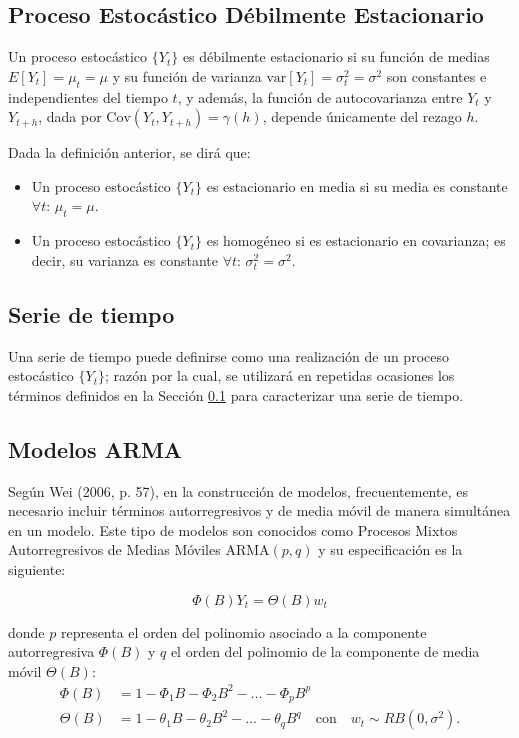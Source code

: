 \documentclass[11pt,letterpaper]{article}
\begin{document}
\subsection{Proceso Estocástico Débilmente Estacionario}
\label{sec:proceso_estocastico}
Un proceso estocástico $\{Y_t\}$ es débilmente estacionario si su función de medias $E[Y_t] = \mu_t = \mu$ y su función de varianza $\text{var}[Y_t] = \sigma_t^2 = \sigma^2$ son constantes e independientes del tiempo $t$, y además, la función de autocovarianza entre $Y_t$ y $Y_{t+h}$, dada por $\text{Cov}(Y_t, Y_{t+h}) = \gamma(h)$, depende únicamente del rezago $h$.

Dada la definición anterior, se dirá que:
\begin{itemize}
    \item Un proceso estocástico $\{Y_t\}$ es estacionario en media si su media es constante $\forall t$: $\mu_t = \mu$.
    \item Un proceso estocástico $\{Y_t\}$ es homogéneo si es estacionario en covarianza; es decir, su varianza es constante $\forall t$: $\sigma_t^2 = \sigma^2$.
\end{itemize}

\subsection{Serie de tiempo}
Una serie de tiempo puede definirse como una realización de un proceso estocástico $\{Y_t\}$; razón por la cual, se utilizará en repetidas ocasiones los términos definidos en la Sección \ref{sec:proceso_estocastico} para caracterizar una serie de tiempo.

\subsection{Modelos ARMA} 
Según Wei (2006, p. 57), en la construcción de modelos, frecuentemente, es necesario incluir términos autorregresivos y de media móvil de manera simultánea en un modelo. Este tipo de modelos son conocidos como Procesos Mixtos Autorregresivos de Medias Móviles $\text{ARMA}(p,q)$ y su especificación es la siguiente:

\begin{equation*}
\Phi(B)Y_t = \Theta(B)w_t
\end{equation*}

donde $p$ representa el orden del polinomio asociado a la componente autorregresiva $\Phi(B)$ y $q$ el orden del polinomio de la componente de media móvil $\Theta(B)$:
\begin{align*}
\Phi(B) &= 1 - \Phi_1 B - \Phi_2 B^2 - \dots - \Phi_p B^p \\
\Theta(B) &= 1 - \theta_1 B - \theta_2 B^2 - \dots - \theta_q B^q \quad \text{con} \quad w_t \sim RB(0, \sigma^2).
\end{align*}
\end{document}
